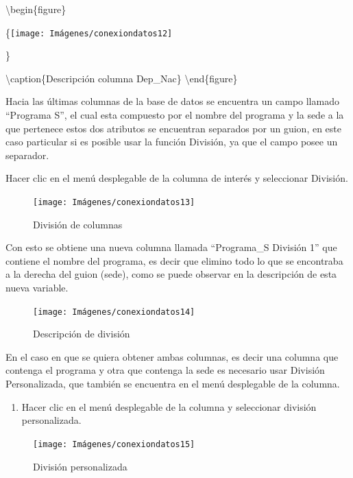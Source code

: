 \documentclass[
]{book}
\providecommand{\tightlist}{%
  \setlength{\itemsep}{0pt}\setlength{\parskip}{0pt}}
\begin{document}
\textbackslash begin\{figure\}

\{\centering \texttt{[image: Imágenes/conexiondatos12]}

\}

\textbackslash caption\{Descripción columna Dep\_Nac\}\label{fig:descripcion-fig}
\textbackslash end\{figure\}

Hacia las últimas columnas de la base de datos se encuentra un campo llamado ``Programa S'', el cual esta compuesto por el nombre del programa y la sede a la que pertenece estos dos atributos se encuentran separados por un guion, en este caso particular si es posible usar la función División, ya que el campo posee un separador.

Hacer clic en el menú desplegable de la columna de interés y seleccionar División.

\begin{figure}

{\centering \texttt{[image: Imágenes/conexiondatos13]} 

}

\caption{División de columnas}\label{fig:división-fig}
\end{figure}

Con esto se obtiene una nueva columna llamada ``Programa\_S División 1'' que contiene el nombre del programa, es decir que elimino todo lo que se encontraba a la derecha del guion (sede), como se puede observar en la descripción de esta nueva variable.

\begin{figure}

{\centering \texttt{[image: Imágenes/conexiondatos14]} 

}

\caption{Descripción de división}\label{fig:divisióndescripcion-fig}
\end{figure}

En el caso en que se quiera obtener ambas columnas, es decir una columna que contenga el programa y otra que contenga la sede es necesario usar División Personalizada, que también se encuentra en el menú desplegable de la columna.

\begin{enumerate}
\def\labelenumi{\arabic{enumi}.}
\tightlist
\item
  Hacer clic en el menú desplegable de la columna y seleccionar división personalizada.
\end{enumerate}

\begin{figure}

{\centering \texttt{[image: Imágenes/conexiondatos15]} 

}

\caption{División personalizada}\label{fig:divisiónpersonalizada-fig}
\end{figure}
\end{document}
